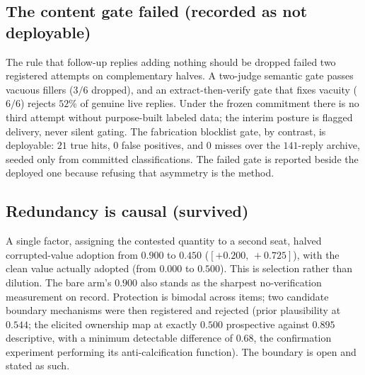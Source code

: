 \documentclass[11pt]{article}
\newcommand{\ci}[2]{\ensuremath{[#1,\,#2]}}
\begin{document}
\subsection{The content gate failed (recorded as not deployable)}

The rule that follow-up replies adding nothing should be dropped failed
two registered attempts on complementary halves. A two-judge semantic
gate passes vacuous fillers ($3/6$ dropped), and an extract-then-verify
gate that fixes vacuity ($6/6$) rejects $52\%$ of genuine live replies.
Under the frozen commitment there is no third attempt without
purpose-built labeled data; the interim posture is flagged delivery,
never silent gating. The fabrication blocklist gate, by contrast, is
deployable: $21$ true hits, $0$ false positives, and $0$ misses over the
$141$-reply archive, seeded only from committed classifications. The
failed gate is reported beside the deployed one because refusing that
asymmetry is the method.

\subsection{Redundancy is causal (survived)}

A single factor, assigning the contested quantity to a second seat,
halved corrupted-value adoption from $0.900$ to $0.450$
(\ci{+0.200}{+0.725}), with the clean value actually adopted (from
$0.000$ to $0.500$). This is selection rather than dilution. The bare
arm's $0.900$ also stands as the sharpest no-verification measurement
on record. Protection is bimodal across items; two candidate boundary
mechanisms were then registered and rejected (prior plausibility at
$0.544$; the elicited ownership map at exactly $0.500$ prospective
against $0.895$ descriptive, with a minimum detectable difference of
$0.68$, the confirmation experiment performing its anti-calcification
function). The boundary is open and stated as such.
\end{document}
